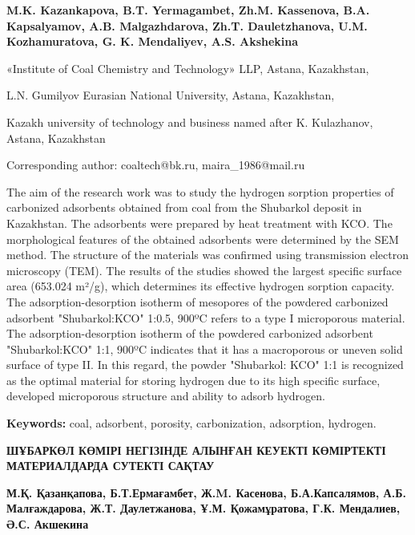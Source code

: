
\begin{header}

{\bfseries
{}M.K. Kazankapova\envelope,
B.T. Yermagambet,
Zh.M. Kassenova,
B.A. Kapsalyamov,
A.B. Malgazhdarova,
Zh.T. Dauletzhanova,
U.M. Kozhamuratova,
G. K. Mendaliyev,
A.S. Akshekina
}
\end{header}

\begin{affil}
«Institute of Coal Chemistry and Technology» LLP, Astana, Kazakhstan,

L.N. Gumilyov Eurasian National University, Astana, Kazakhstan,

Kazakh university of technology and business named after K. Kulazhanov, Astana, Kazakhstan

\envelope Corresponding author: coaltech@bk.ru, maira\_1986@mail.ru
\end{affil}

The aim of the research work was to study the hydrogen sorption
properties of carbonized adsorbents obtained from coal from the
Shubarkol deposit in Kazakhstan. The adsorbents were prepared by heat
treatment with KCO. The morphological
features of the obtained adsorbents were determined by the SEM method.
The structure of the materials was confirmed using transmission electron
microscopy (TEM). The results of the studies showed the largest specific
surface area (653.024 m²/g), which determines its effective hydrogen
sorption capacity. The adsorption-desorption isotherm of mesopores of
the powdered carbonized adsorbent
"Shubarkol:KCO" 1:0.5, 900ºC refers to
a type I microporous material. The adsorption-desorption isotherm of the
powdered carbonized adsorbent
"Shubarkol:KCO" 1:1, 900ºC indicates
that it has a macroporous or uneven solid surface of type II. In this
regard, the powder "Shubarkol: KCO" 1:1
is recognized as the optimal material for storing hydrogen due to its
high specific surface, developed microporous structure and ability to
adsorb hydrogen.

{\bfseries Keywords:} coal, adsorbent, porosity, carbonization, adsorption,
hydrogen.

\begin{header}
{\bfseries ШҰБАРКӨЛ КӨМІРІ НЕГІЗІНДЕ АЛЫНҒАН КЕУЕКТІ КӨМІРТЕКТІ
МАТЕРИАЛДАРДА СУТЕКТІ САҚТАУ}

{\bfseries
{}М.Қ. Қазанқапова\envelope,
Б.Т.Ермағамбет,
Ж.M. Касенова,
Б.А.Капсалямов,
А.Б. Малғаждарова,
Ж.Т. Даулетжанова,
Ұ.М. Қожамұратова,
Г.К. Мендалиев,
Ә.С. Акшекина
}
\end{header}

